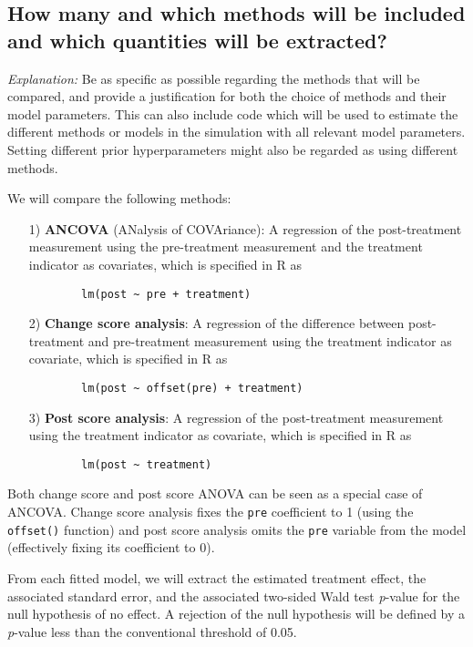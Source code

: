 \documentclass[12pt]{article}
\begin{document}
\subsection{How many and which methods will be included and which quantities will be extracted?}

\textit{Explanation:} Be as specific as possible regarding the methods that will be compared, and provide a justification for both the choice of methods and their model parameters. This can also include code which will be used to estimate the different methods or models in the simulation with all relevant model parameters. Setting different prior hyperparameters might also be regarded as using different methods.

\begin{examplebox}
We will compare the following methods:
    \begin{itemize}
    \item[1)] \textbf{ANCOVA} (ANalysis of COVAriance): A regression of the post-treatment measurement using the pre-treatment measurement and the treatment indicator as covariates,
    which is specified in R as
    \begin{verbatim}
        lm(post ~ pre + treatment)
    \end{verbatim}

    \item[2)] \textbf{Change score analysis}: A regression of the difference between post-treatment and pre-treatment measurement using the treatment indicator as covariate,
    which is specified in R as
    \begin{verbatim}
        lm(post ~ offset(pre) + treatment)
    \end{verbatim}

    \item[3)] \textbf{Post score analysis}: A regression of the post-treatment measurement using the treatment indicator as covariate,
    which is specified in R as
    \begin{verbatim}
        lm(post ~ treatment)
    \end{verbatim}
\end{itemize}
Both change score and post score ANOVA can be seen as a special case of ANCOVA. Change score analysis fixes the \texttt{pre} coefficient to 1 (using the \texttt{offset()} function) and post score analysis omits the \texttt{pre} variable from the model (effectively fixing its coefficient to 0).

From each fitted model, we will extract the estimated treatment effect, the associated standard error, and the associated two-sided Wald test \textit{p}-value for the null hypothesis of no effect. A rejection of the null hypothesis will be defined by a \textit{p}-value less than the conventional threshold of 0.05.
\end{examplebox}
\end{document}
